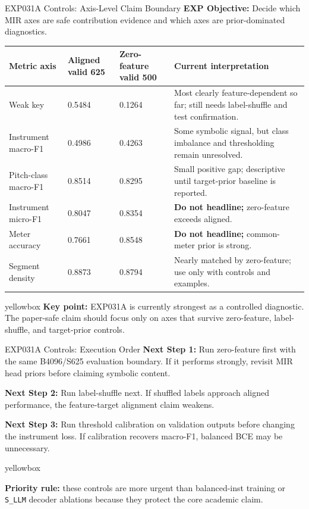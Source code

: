 \documentclass[aspectratio=169,11pt]{beamer}
\newcommand{\missing}[1]{{\color{missingred}\textbf{#1}}}
\newcommand{\code}[1]{\texttt{\footnotesize #1}}
\newcommand{\expfield}[2]{\textbf{#1:} #2\par\vspace{0.10cm}}
\newenvironment{keybox}{%
  \begin{beamercolorbox}[rounded=true,sep=0.14cm,wd=\linewidth]{yellowbox}\footnotesize%
}{%
  \end{beamercolorbox}%
}
\begin{document}
\begin{frame}{EXP031A Controls: Axis-Level Claim Boundary}
  \footnotesize
  \expfield{EXP Objective}{Decide which MIR axes are safe contribution evidence and which axes are prior-dominated diagnostics.}

  \begin{tabularx}{\linewidth}{p{2.6cm}p{1.55cm}p{1.75cm}Y}
    \toprule
    Metric axis & Aligned valid 625 & Zero-feature valid 500 & Current interpretation \\
    \midrule
    Weak key & 0.5484 & 0.1264 & Most clearly feature-dependent so far; still needs label-shuffle and test confirmation. \\
    Instrument macro-F1 & 0.4986 & 0.4263 & Some symbolic signal, but class imbalance and thresholding remain unresolved. \\
    Pitch-class macro-F1 & 0.8514 & 0.8295 & Small positive gap; descriptive until target-prior baseline is reported. \\
    Instrument micro-F1 & 0.8047 & 0.8354 & \missing{Do not headline;} zero-feature exceeds aligned. \\
    Meter accuracy & 0.7661 & 0.8548 & \missing{Do not headline;} common-meter prior is strong. \\
    Segment density & 0.8873 & 0.8794 & Nearly matched by zero-feature; use only with controls and examples. \\
    \bottomrule
  \end{tabularx}

  \vspace{0.16cm}
  \begin{keybox}\textbf{Key point:} EXP031A is currently strongest as a controlled diagnostic. The paper-safe claim should focus only on axes that survive zero-feature, label-shuffle, and target-prior controls.\end{keybox}
\end{frame}

\begin{frame}{EXP031A Controls: Execution Order}
  \footnotesize
  \expfield{Next Step 1}{Run zero-feature first with the same B4096/S625 evaluation boundary. If it performs strongly, revisit MIR head priors before claiming symbolic content.}
  \expfield{Next Step 2}{Run label-shuffle next. If shuffled labels approach aligned performance, the feature-target alignment claim weakens.}
  \expfield{Next Step 3}{Run threshold calibration on validation outputs before changing the instrument loss. If calibration recovers macro-F1, balanced BCE may be unnecessary.}

  \begin{keybox}
    \textbf{Priority rule:} these controls are more urgent than balanced-inst training or \code{S\_LLM} decoder ablations because they protect the core academic claim.
  \end{keybox}
\end{frame}
\end{document}
